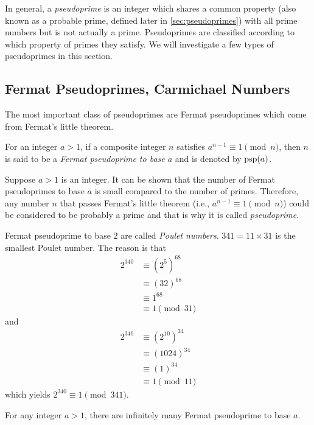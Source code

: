 In general, a \textit{pseudoprime} is an integer which shares a common property (also known as a probable prime, defined later in \autoref{sec:pseudoprimes}) with all prime numbers but is not actually a prime. Pseudoprimes are classified according to which property of primes they satisfy. We will investigate a few types of pseudoprimes in this section.

\subsection{Fermat Pseudoprimes,  Carmichael Numbers}
The most important class of pseudoprimes are Fermat pseudoprimes which come from Fermat's little theorem.
	\begin{definition}
		For an integer $a>1$, if a composite integer $n$ satisfies $a^{n-1}\equiv 1\pmod n$, then $n$ is said to be a \textit{Fermat pseudoprime to base $a$} and is denoted by $\operatorname{psp}(a)$.
	\end{definition}
Suppose $a>1$ is an integer. It can be shown that the number of Fermat pseudoprimes to base $a$ is small compared to the number of primes. Therefore, any number $n$ that passes Fermat's little theorem (i.e., $a^{n-1} \equiv 1 \pmod n$) could be considered to be probably a prime and that is why it is called \textit{pseudoprime}.

	\begin{example}
		Fermat pseudoprime to base $2$ are called \textit{Poulet numbers}. $341=11\times 31$ is the smallest Poulet number. The reason is that
			\begin{align*}
				2^{340}
					& \equiv \left(2^5\right)^{68}\\
					& \equiv (32)^{68}\\
					& \equiv 1^{68}\\
					& \equiv 1 \pmod{31}
			\end{align*}
		and
			\begin{align*}
				2^{340}
					& \equiv \left(2^{10}\right)^{34}\\
					& \equiv (1024)^{34}\\
					& \equiv (1)^{34}\\
					& \equiv 1 \pmod{11}
			\end{align*}
		which yields $2^{340} \equiv 1 \pmod{341}$.
	\end{example}


	\begin{theorem}
		For any integer $a>1$, there are infinitely many Fermat pseudoprime to base $a$.
	\end{theorem}

